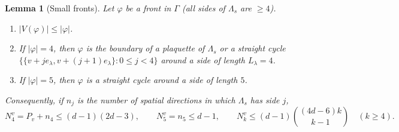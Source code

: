 \documentclass[11pt,a4paper]{article}
\newtheorem{lemma}[theorem]{Lemma}
\theoremstyle{definition}
\theoremstyle{remark}
\begin{document}
\begin{lemma}[Small fronts]\label{mg:lem:smallfronts}
Let $\varphi$ be a front in $\Gamma$ (all sides of $\Lambda_s$ are $\ge4$).
\begin{enumerate}[label=(\roman*)]
\item $|V(\varphi)|\le|\varphi|$.
\item If $|\varphi|=4$, then $\varphi$ is the boundary of a plaquette of $\Lambda_s$ or a straight cycle $\{\{v+je_\lambda,v+(j+1)e_\lambda\}:0\le j<4\}$ around a
side of length $L_\lambda=4$.
\item If $|\varphi|=5$, then $\varphi$ is a straight cycle around a side of length $5$.
\end{enumerate}
Consequently, if $n_j$ is the number of spatial directions in which $\Lambda_s$ has side $j$,
\[
N^v_4=P_v+n_4\le(d-1)(2d-3),\qquad N^v_5=n_5\le d-1,\qquad N^v_k\le(d-1)\binom{(4d-6)k}{k-1}\quad(k\ge4).
\]
\end{lemma}
\end{document}

